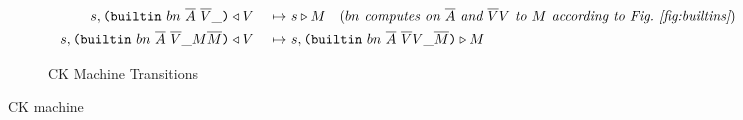 \documentclass[../plutus-core-specification.tex]{subfiles}
\begin{document}
\begin{figure}[H]
\begin{subfigure}[c]{\linewidth}
\begin{minipage}{\linewidth}
\begin{alignat*}{2}
        s, \texttt{(} \texttt{builtin} ~ bn ~ \overline{A} ~ \overline{V} \_  \texttt{)}& \triangleleft V& ~\mapsto~ &s \triangleright M 
          \quad (\textit{$bn$ computes on $\overline{A}$ and $\overline{V}V$ to $M$ according to Fig.~\ref{fig:builtins}})\\
        s, \texttt{(} \texttt{builtin} ~ bn ~ \overline{A} ~ \overline{V} \_ M \overline{M} \texttt{)}& \triangleleft V& ~\mapsto~ &s, \texttt{(} \texttt{builtin} ~ bn ~ \overline{A} ~ \overline{V} V \_ \overline{M} \texttt{)} \triangleright M\\
    \end{alignat*}
\end{minipage}
    \caption{CK Machine Transitions}
    \label{fig:ck-transitions}
\end{subfigure}
\caption{CK machine}
\label{fig:ck-machine}
\end{figure}
\end{document}
